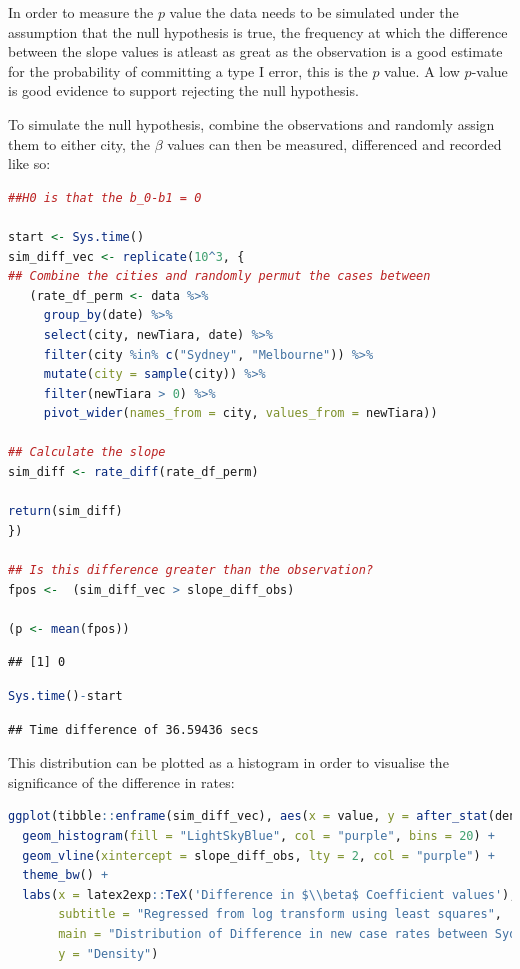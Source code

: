 \documentclass{article}
\begin{document}
In order to measure the \(p\) value the data needs to be simulated under
the assumption that the null hypothesis is true, the frequency at which
the difference between the slope values is atleast as great as the
observation is a good estimate for the probability of committing a type
I error, this is the \(p\) value. A low \(p\)-value is good evidence to
support rejecting the null hypothesis.

To simulate the null hypothesis, combine the observations and randomly
assign them to either city, the \(\beta\) values can then be measured,
differenced and recorded like so:

\begin{lstlisting}[language=R]
##H0 is that the b_0-b1 = 0

start <- Sys.time()
sim_diff_vec <- replicate(10^3, {
## Combine the cities and randomly permut the cases between
   (rate_df_perm <- data %>% 
     group_by(date) %>% 
     select(city, newTiara, date) %>% 
     filter(city %in% c("Sydney", "Melbourne")) %>% 
     mutate(city = sample(city)) %>% 
     filter(newTiara > 0) %>% 
     pivot_wider(names_from = city, values_from = newTiara))
  
## Calculate the slope
sim_diff <- rate_diff(rate_df_perm)

return(sim_diff)
}) 

## Is this difference greater than the observation?
fpos <-  (sim_diff_vec > slope_diff_obs)

(p <- mean(fpos))
\end{lstlisting}

\begin{lstlisting}
## [1] 0
\end{lstlisting}

\begin{lstlisting}[language=R]
Sys.time()-start
\end{lstlisting}

\begin{lstlisting}
## Time difference of 36.59436 secs
\end{lstlisting}

This distribution can be plotted as a histogram in order to visualise
the significance of the difference in rates:

\begin{lstlisting}[language=R]
ggplot(tibble::enframe(sim_diff_vec), aes(x = value, y = after_stat(density))) +
  geom_histogram(fill = "LightSkyBlue", col = "purple", bins = 20) +
  geom_vline(xintercept = slope_diff_obs, lty = 2, col = "purple") +
  theme_bw() +
  labs(x = latex2exp::TeX('Difference in $\\beta$ Coefficient values'),
       subtitle = "Regressed from log transform using least squares", 
       main = "Distribution of Difference in new case rates between Sydney and Melbourne", 
       y = "Density")
\end{lstlisting}
\end{document}
